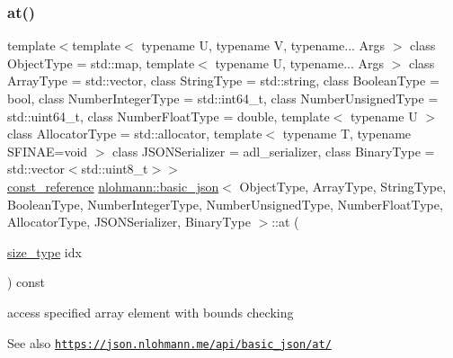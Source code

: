 \subsubsection{\texorpdfstring{at()}{at()}\hspace{0.1cm}{\footnotesize\ttfamily [2/6]}}
{\footnotesize\ttfamily template$<$template$<$ typename U, typename V, typename... Args $>$ class Object\+Type = std\+::map, template$<$ typename U, typename... Args $>$ class Array\+Type = std\+::vector, class String\+Type  = std\+::string, class Boolean\+Type  = bool, class Number\+Integer\+Type  = std\+::int64\+\_\+t, class Number\+Unsigned\+Type  = std\+::uint64\+\_\+t, class Number\+Float\+Type  = double, template$<$ typename U $>$ class Allocator\+Type = std\+::allocator, template$<$ typename T, typename S\+F\+I\+N\+A\+E=void $>$ class J\+S\+O\+N\+Serializer = adl\+\_\+serializer, class Binary\+Type  = std\+::vector$<$std\+::uint8\+\_\+t$>$$>$ \\
\hyperlink{classnlohmann_1_1basic__json_ab8a1c33ee7b154fc41ca2545aa9724e6}{const\+\_\+reference} \hyperlink{classnlohmann_1_1basic__json}{nlohmann\+::basic\+\_\+json}$<$ Object\+Type, Array\+Type, String\+Type, Boolean\+Type, Number\+Integer\+Type, Number\+Unsigned\+Type, Number\+Float\+Type, Allocator\+Type, J\+S\+O\+N\+Serializer, Binary\+Type $>$\+::at (\begin{DoxyParamCaption}\item[{\hyperlink{classnlohmann_1_1basic__json_a3ada29bca70b4965f6fd37ec1c8f85f7}{size\+\_\+type}}]{idx }\end{DoxyParamCaption}) const\hspace{0.3cm}{\ttfamily [inline]}}



access specified array element with bounds checking 

\begin{DoxySeeAlso}{See also}
\href{https://json.nlohmann.me/api/basic_json/at/}{\tt https\+://json.\+nlohmann.\+me/api/basic\+\_\+json/at/} 
\end{DoxySeeAlso}
\mbox{\label{classnlohmann_1_1basic__json_a239e942da82f2597d0cf5ec806f5bc0d}} 
